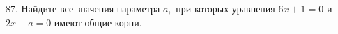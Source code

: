 87. Найдите все значения параметра $a,$ при которых уравнения $6x+1=0$ и $2x-a=0$ имеют общие корни.\\
